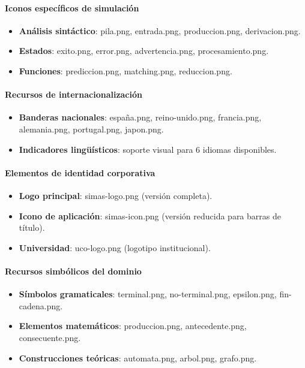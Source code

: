 \paragraph{Iconos específicos de simulación}
\begin{itemize}
    \item \textbf{Análisis sintáctico}: pila.png, entrada.png, produccion.png, derivacion.png.
    \item \textbf{Estados}: exito.png, error.png, advertencia.png, procesamiento.png.
    \item \textbf{Funciones}: prediccion.png, matching.png, reduccion.png.
\end{itemize}

\paragraph{Recursos de internacionalización}
\begin{itemize}
    \item \textbf{Banderas nacionales}: españa.png, reino-unido.png, francia.png, alemania.png, portugal.png, japon.png.
    \item \textbf{Indicadores lingüísticos}: soporte visual para 6 idiomas disponibles.
\end{itemize}

\paragraph{Elementos de identidad corporativa}
\begin{itemize}
    \item \textbf{Logo principal}: simas-logo.png (versión completa).
    \item \textbf{Icono de aplicación}: simas-icon.png (versión reducida para barras de título).
    \item \textbf{Universidad}: uco-logo.png (logotipo institucional).
\end{itemize}

\paragraph{Recursos simbólicos del dominio}
\begin{itemize}
    \item \textbf{Símbolos gramaticales}: terminal.png, no-terminal.png, epsilon.png, fin-cadena.png.
    \item \textbf{Elementos matemáticos}: produccion.png, antecedente.png, consecuente.png.
    \item \textbf{Construcciones teóricas}: automata.png, arbol.png, grafo.png.
\end{itemize}

